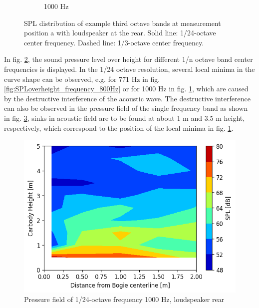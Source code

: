 \begin{figure}[H]
\begin{subfigure}[b]{0.48\textwidth}
        \caption{1000 Hz}
        \label{fig:SPLoverheight_frequency_1000Hz}
    \end{subfigure}
    \caption{SPL distribution of example third octave bands at measurement position a with loudspeaker at the rear. Solid line: 1/24-octave center frequency. Dashed line: 1/3-octave center frequency.}
    \label{fig:SPLoverheight_frequency}
\end{figure}

\noindent In fig. \ref{fig:SPLoverheight_frequency}, the sound pressure level over height for different 1/n octave band center frequencies is displayed. In the 1/24 octave resolution, several local minima in the curve shape can be observed, e.g. for 771 Hz in fig. \ref{fig:SPLoverheight_frequency_800Hz} or for 1000 Hz in fig. \ref{fig:SPLoverheight_frequency_1000Hz}, which are caused by the destructive interference of the acoustic wave. The destructive interference can also be observed in the pressure field of the single frequency band as shown in fig. \ref{fig:pressurefield_1000Hz}, sinks in acoustic field are to be found at about 1 m and 3.5 m height, respectively, which correspond to the position of the local minima in fig. \ref{fig:SPLoverheight_frequency_1000Hz}.

\begin{figure}[H]
    \centering
    \includegraphics[width=0.6\linewidth]{fig/pressure_field_1000Hz.png}
    \caption{Pressure field of 1/24-octave frequency 1000 Hz, loudspeaker rear}
    \label{fig:pressurefield_1000Hz}
\end{figure}
